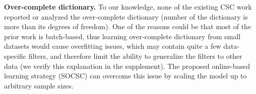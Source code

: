 
{\bfseries Over-complete dictionary.} To our knowledge, none of the
existing CSC work reported or analyzed the over-complete dictionary
(number of the dictionary is more than its degrees of freedom). One of
the reasons could be that most of the prior work is batch-based, thus
learning over-complete dictionary from small datasets would cause
overfitting issues, which may contain quite a few data-specific
filters, and therefore limit the ability to generalize the filters to
other data (we verify this explanation in the supplement). The
proposed online-based learning strategy (SOCSC) can overcome this
issue by scaling the model up to arbitrary sample sizes.

